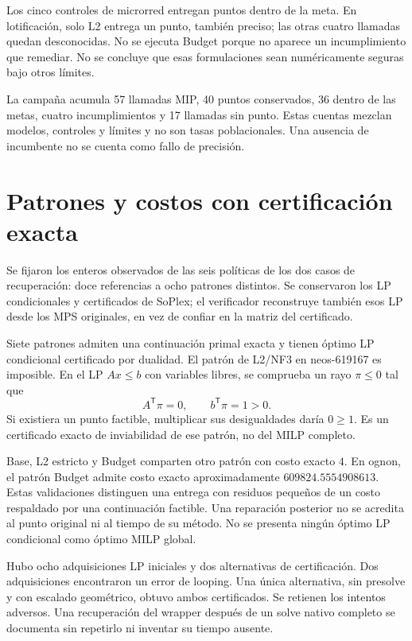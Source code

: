 \documentclass[10pt,a4paper]{article}
\begin{document}
Los cinco controles de microrred entregan puntos dentro de la meta. En lotificación,
solo L2 entrega un punto, también preciso; las otras cuatro llamadas quedan
desconocidas. No se ejecuta Budget porque no aparece un incumplimiento que remediar.
No se concluye que esas formulaciones sean numéricamente seguras bajo otros límites.

La campaña acumula 57 llamadas MIP, 40 puntos conservados, 36 dentro de las metas,
cuatro incumplimientos y 17 llamadas sin punto. Estas cuentas mezclan modelos,
controles y límites y no son tasas poblacionales. Una ausencia de incumbente
no se cuenta como fallo de precisión.

\section{Patrones y costos con certificación exacta}
Se fijaron los enteros observados de las seis políticas de los dos casos de
recuperación: doce referencias a ocho patrones distintos. Se conservaron los LP
condicionales y certificados de SoPlex; el verificador reconstruye también esos
LP desde los MPS originales, en vez de confiar en la matriz del certificado.

Siete patrones admiten una continuación primal exacta y tienen óptimo LP
condicional certificado por dualidad. El patrón de L2/NF3 en neos-619167 es
imposible. En el LP $Ax\le b$ con variables libres, se comprueba un rayo
$\pi\le0$ tal que
\[
 A^{\mathsf T}\pi=0,\qquad b^{\mathsf T}\pi=1>0.
\]
Si existiera un punto factible, multiplicar sus desigualdades daría $0\ge1$.
Es un certificado exacto de inviabilidad de ese patrón, no del MILP completo.

Base, L2 estricto y Budget comparten otro patrón con costo exacto $4$.
En ognon, el patrón Budget admite costo exacto aproximadamente
$609824.5554908613$. Estas validaciones distinguen una entrega con residuos
pequeños de un costo respaldado por una continuación factible. Una reparación
posterior no se acredita al punto original ni al tiempo de su método.
No se presenta ningún óptimo LP condicional como óptimo MILP global.

Hubo ocho adquisiciones LP iniciales y dos alternativas de certificación.
Dos adquisiciones encontraron un error de looping. Una única alternativa,
sin presolve y con escalado geométrico, obtuvo ambos certificados. Se retienen
los intentos adversos. Una recuperación del wrapper después de un solve nativo
completo se documenta sin repetirlo ni inventar su tiempo ausente.
\end{document}
